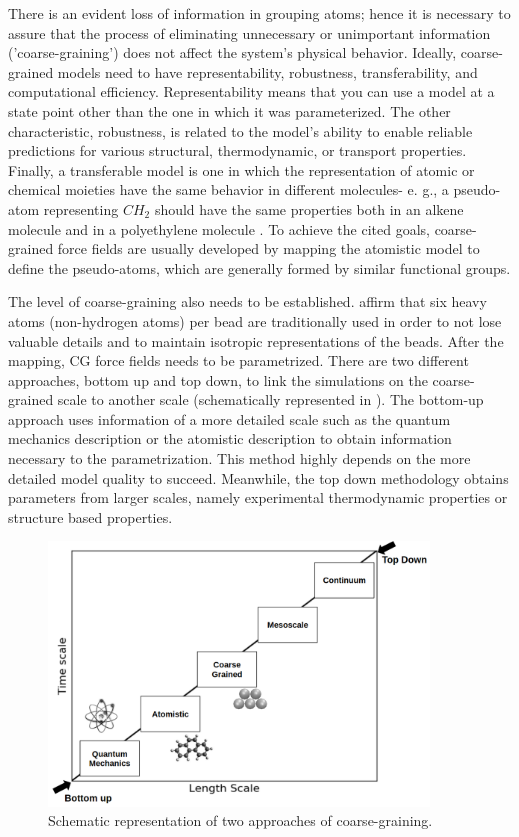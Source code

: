 There is an evident loss of information in grouping atoms; hence it is necessary to assure that the process of eliminating unnecessary or unimportant information ('coarse-graining') does not affect the system's physical behavior. Ideally, coarse-grained models need to have representability, robustness, transferability, and computational efficiency. Representability means that you can use a model at a state point other than the one in which it was parameterized. The other characteristic, robustness, is related to the model's ability to enable reliable predictions for various structural, thermodynamic, or transport properties. Finally, a transferable model is one in which the representation of atomic or chemical moieties have the same behavior in different molecules- e. g., a pseudo-atom representing $CH_{2}$ should have the same properties both in an alkene molecule and in a polyethylene molecule     \cite{doi:10.1146/annurev-chembioeng-061312-103314}. To achieve the cited goals, coarse-grained force fields are usually developed by mapping the atomistic model to define the pseudo-atoms, which are generally formed by similar functional groups. 

The level of coarse-graining also needs to be established.  affirm that six heavy atoms (non-hydrogen atoms) per bead are traditionally used in order to not lose valuable details and to maintain isotropic representations of the beads. After the mapping, CG force fields needs to be parametrized. There are two different approaches, bottom up and top down, to link the simulations on the coarse-grained scale to another scale (schematically represented in ). The bottom-up approach uses information of a more detailed scale such as the quantum mechanics description or the atomistic description to obtain information necessary to the parametrization. This method highly depends on the more detailed model quality to succeed. Meanwhile, the top down methodology obtains parameters from larger scales, namely experimental thermodynamic properties or structure based properties. 

\begin{figure}[H]
	\raggedleft
	\includegraphics[width=0.9\textwidth]{Figures/multiscale}
	\caption{Schematic representation of two approaches of coarse-graining.}
	\label{fig:multiscale}
\end{figure}
\FloatBarrier

